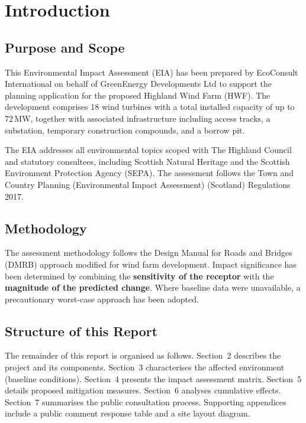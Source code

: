 \section{Introduction}

\subsection{Purpose and Scope}
This Environmental Impact Assessment (EIA) has been prepared by EcoConsult International on behalf of GreenEnergy Developments Ltd to support the planning application for the proposed Highland Wind Farm (HWF). The development comprises 18 wind turbines with a total installed capacity of up to 72\,MW, together with associated infrastructure including access tracks, a substation, temporary construction compounds, and a borrow pit.

The EIA addresses all environmental topics scoped with The Highland Council and statutory consultees, including Scottish Natural Heritage and the Scottish Environment Protection Agency (SEPA). The assessment follows the Town and Country Planning (Environmental Impact Assessment) (Scotland) Regulations 2017.

\subsection{Methodology}
The assessment methodology follows the Design Manual for Roads and Bridges (DMRB) approach modified for wind farm development. Impact significance has been determined by combining the \textbf{sensitivity of the receptor} with the \textbf{magnitude of the predicted change}. Where baseline data were unavailable, a precautionary worst-case approach has been adopted.

\subsection{Structure of this Report}
The remainder of this report is organised as follows. Section~2 describes the project and its components. Section~3 characterises the affected environment (baseline conditions). Section~4 presents the impact assessment matrix. Section~5 details proposed mitigation measures. Section~6 analyses cumulative effects. Section~7 summarises the public consultation process. Supporting appendices include a public comment response table and a site layout diagram.

